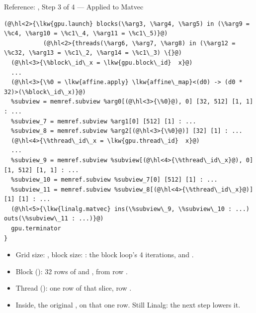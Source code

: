 \documentclass[aspectratio=169,10pt]{beamer}
\begin{document}
\begin{frame}[fragile]{Reference: , Step 3 of 4 --- Applied to Matvec}
\begin{lstlisting}[language=mlir,basicstyle=\ttfamily\fontsize{6.6}{7.9}\selectfont]
(@\hl<2>{\lkw{gpu.launch} blocks(\%arg3, \%arg4, \%arg5) in (\%arg9 = \%c4, \%arg10 = \%c1\_4, \%arg11 = \%c1\_5)}@)
           (@\hl<2>{threads(\%arg6, \%arg7, \%arg8) in (\%arg12 = \%c32, \%arg13 = \%c1\_2, \%arg14 = \%c1\_3) \{}@)
  (@\hl<3>{\%block\_id\_x = \lkw{gpu.block\_id}  x}@)
  ...
  (@\hl<3>{\%0 = \lkw{affine.apply} \lkw{affine\_map}<(d0) -> (d0 * 32)>(\%block\_id\_x)}@)
  %subview = memref.subview %arg0[(@\hl<3>{\%0}@), 0] [32, 512] [1, 1] : ...
  %subview_7 = memref.subview %arg1[0] [512] [1] : ...
  %subview_8 = memref.subview %arg2[(@\hl<3>{\%0}@)] [32] [1] : ...
  (@\hl<4>{\%thread\_id\_x = \lkw{gpu.thread\_id}  x}@)
  ...
  %subview_9 = memref.subview %subview[(@\hl<4>{\%thread\_id\_x}@), 0] [1, 512] [1, 1] : ...
  %subview_10 = memref.subview %subview_7[0] [512] [1] : ...
  %subview_11 = memref.subview %subview_8[(@\hl<4>{\%thread\_id\_x}@)] [1] [1] : ...
  (@\hl<5>{\lkw{linalg.matvec} ins(\%subview\_9, \%subview\_10 : ...) outs(\%subview\_11 : ...)}@)
  gpu.terminator
}
\end{lstlisting}
  \vspace{0.3em}
  \begin{itemize}
    \item<2-> Grid size: , block size: : the
      block loop's 4 iterations, and .
    \item<3-> Block  (): 32 rows of  and
      , from row .
    \item<4-> Thread  (): one row of that slice,
      row .
    \item<5-> Inside, the original , on that one row. Still
      Linalg: the next step lowers it.
  \end{itemize}
\end{frame}
\end{document}
